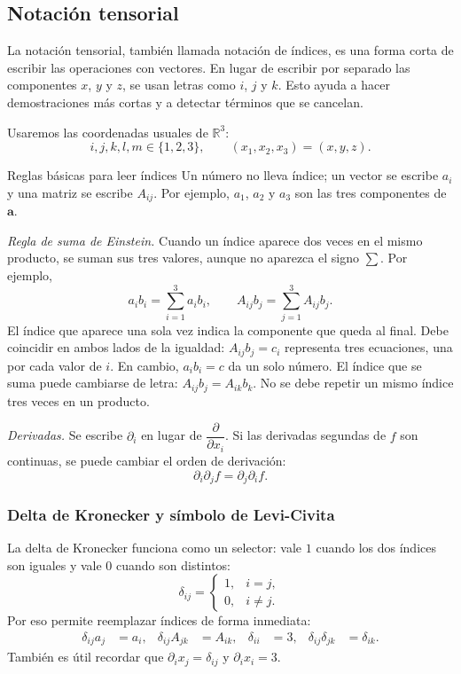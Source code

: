 \subsection{Notación tensorial}

La notación tensorial, también llamada notación de índices, es una forma corta de escribir las operaciones con vectores. En lugar de escribir por separado las componentes $x$, $y$ y $z$, se usan letras como $i$, $j$ y $k$. Esto ayuda a hacer demostraciones más cortas y a detectar términos que se cancelan.

Usaremos las coordenadas usuales de $\mathbb{R}^3$:
\[
i,j,k,l,m \in \{1,2,3\},
\qquad
(x_1,x_2,x_3)=(x,y,z).
\]

\begin{mynote}{Reglas básicas para leer índices}
Un número no lleva índice; un vector se escribe $a_i$ y una matriz se escribe $A_{ij}$. Por ejemplo, $a_1$, $a_2$ y $a_3$ son las tres componentes de $\mathbf{a}$.

\emph{Regla de suma de Einstein.} Cuando un índice aparece dos veces en el mismo producto, se suman sus tres valores, aunque no aparezca el signo $\sum$. Por ejemplo,
\[
a_i b_i=\sum_{i=1}^{3}a_i b_i,
\qquad
A_{ij}b_j=\sum_{j=1}^{3}A_{ij}b_j.
\]
El índice que aparece una sola vez indica la componente que queda al final. Debe coincidir en ambos lados de la igualdad: $A_{ij}b_j=c_i$ representa tres ecuaciones, una por cada valor de $i$. En cambio, $a_i b_i=c$ da un solo número. El índice que se suma puede cambiarse de letra: $A_{ij}b_j=A_{ik}b_k$. No se debe repetir un mismo índice tres veces en un producto.

\emph{Derivadas.} Se escribe $\partial_i$ en lugar de $\dfrac{\partial}{\partial x_i}$. Si las derivadas segundas de $f$ son continuas, se puede cambiar el orden de derivación:
\[
\partial_i\partial_j f=\partial_j\partial_i f.
\]
\end{mynote}

\subsubsection*{Delta de Kronecker y símbolo de Levi-Civita}

La delta de Kronecker funciona como un selector: vale $1$ cuando los dos índices son iguales y vale $0$ cuando son distintos:
\[
\delta_{ij}=
\begin{cases}
1,& i=j,\\
0,& i\ne j.
\end{cases}
\]
Por eso permite reemplazar índices de forma inmediata:
\begin{align*}
\delta_{ij}a_j&=a_i, &
\delta_{ij}A_{jk}&=A_{ik}, &
\delta_{ii}&=3, &
\delta_{ij}\delta_{jk}&=\delta_{ik}.
\end{align*}
También es útil recordar que $\partial_i x_j=\delta_{ij}$ y $\partial_i x_i=3$.

